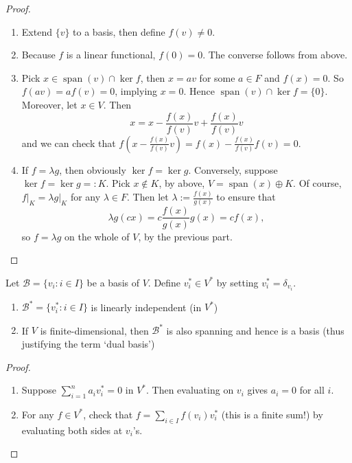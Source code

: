 \documentclass{scrartcl}
\def\B{\mathcal{B}}
\DeclareMathOperator{\spn}{span}  %
\begin{document}
\begin{proof}
	\begin{enumerate}
		\item Extend $\{v\}$ to a basis, then define $f(v) \ne 0$. 
		\item Because $f$ is a linear functional, $f(0)=0$. The converse follows from above. 
		\item Pick $x \in \spn(v) \cap \ker{f}$, then $x = av$ for some $a \in F$ and $f(x)=0$. So $f(av) = af(v)=0$, implying $x = 0$. Hence $\spn(v) \cap \ker{f} = \{0\}$. Moreover, let $x \in V$. Then 
		\[x = x-\frac{f(x)}{f(v)}v+\frac{f(x)}{f(v)}v\]
		and we can check that $f\left(x-\frac{f(x)}{f(v)}v\right) = f(x)-\frac{f(x)}{f(v)}f(v) = 0$.
		\item If $f = \lambda g$, then obviously $\ker{f}=\ker{g}$. Conversely, suppose $\ker{f}=\ker{g} =: K$. Pick $x \notin K$, by above, $V = \spn(x) \oplus K$. Of course, $f\vert_K = \lambda g\vert_K$ for any $\lambda \in F$. Then let $\lambda := \frac{f(x)}{g(x)}$ to ensure that 
		\[\lambda g(cx) = c\frac{f(x)}{g(x)}g(x) = cf(x), \]
		so $f= \lambda g$ on the whole of $V$, by the previous part. 
	\end{enumerate}
\end{proof}
\begin{definition}
	Let $\B = \{v_i: i \in I\}$ be a basis of $V$. Define $v_i^* \in V^*$ by setting $v_i^* = \delta_{v_i}$.
\end{definition}
\begin{theorem}
	\begin{enumerate}
		\item $\B^* = \{v_i^*: i \in I\}$ is linearly independent (in $V^*$)
		\item If $V$ is finite-dimensional, then $\B^*$ is also spanning and hence is a basis (thus justifying the term `dual basis')
	\end{enumerate}
\end{theorem}
\begin{proof}
	\begin{enumerate}
		\item Suppose $\sum_{i=1}^n a_iv_i^* =0$ in $V^*$. Then evaluating on $v_i$ gives $a_i = 0$ for all $i$. 
		\item For any $f \in V^*$, check that $f = \sum_{i\in I} f(v_i)v_i^*$ (this is a finite sum!) by evaluating both sides at $v_i$'s. 
	\end{enumerate}
\end{proof}
\begin{remark}
	
\end{remark}
\end{document}
